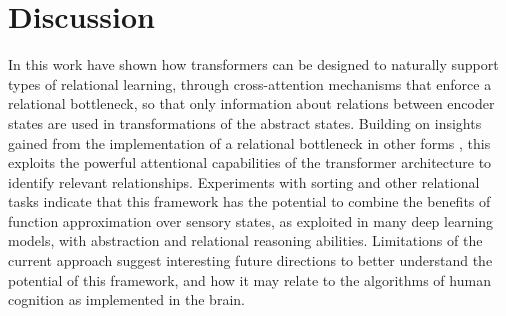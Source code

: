 \section{Discussion}
\label{sec:discuss}



In this work have shown how transformers
can be designed to
%
naturally support types of relational learning, through cross-attention
mechanisms that enforce a relational bottleneck, so that only information about relations between encoder states
are used in transformations of the abstract states.
Building on insights gained from the implementation of a relational bottleneck in other forms \citep{esbn, kerg2022neural}, this exploits the powerful attentional capabilities of the transformer architecture to identify relevant relationships.
Experiments with sorting and other relational tasks indicate that this framework has the potential to combine the benefits of function approximation over sensory states, as exploited in many deep learning models, with abstraction and relational reasoning abilities. Limitations of the current approach suggest interesting
future directions to better understand the potential of this framework, and
how it may relate to the algorithms of human cognition as implemented in the brain.

